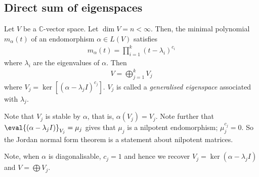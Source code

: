 \subsection{Direct sum of eigenspaces}
\begin{theorem}
	Let $V$ be a $\mathbb C$-vector space.
	Let $\dim V = n < \infty$.
	Then, the minimal polynomial $m_\alpha(t)$ of an endomorphism $\alpha \in L(V)$ satisfies
	\begin{align*}
		m_\alpha(t) = \prod_{i=1}^k (t - \lambda_i)^{c_i}
	\end{align*} where $\lambda_i$ are the eigenvalues of $\alpha$.
	Then
	\begin{align*}
		V = \bigoplus_{j=1}^k V_j
	\end{align*}
	where $V_j = \ker[(\alpha - \lambda_j I)^{c_j}]$.
	$V_j$ is called a \textit{generalised eigenspace} associated with $\lambda_j$.
\end{theorem}
\begin{remark}
	Note that $V_j$ is stable by $\alpha$, that is, $\alpha(V_j) = V_j$.
	Note further that $\eval{(\alpha - \lambda_j I)}_{V_j} = \mu_j$ gives that $\mu_j$ is a nilpotent endomorphism; $\mu_j^{c_j} = 0$.
	So the Jordan normal form theorem is a statement about nilpotent matrices.

	Note, when $\alpha$ is diagonalisable, $c_j = 1$ and hence we recover $V_j = \ker(\alpha - \lambda_j I)$ and $V = \bigoplus V_j$.
\end{remark}
